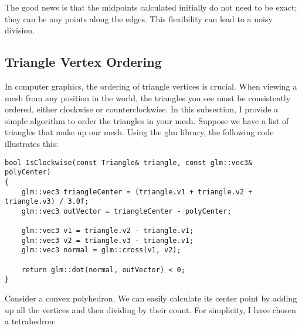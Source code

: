 \documentclass[12pt]{article}
\begin{document}
\begin{center}
	\end{center}
	
	The good news is that the midpoints calculated initially do not need to be exact; they can be any points along the edges. This flexibility can lead to a noisy division.
	
	\subsection{Triangle Vertex Ordering}
	
	In computer graphics, the ordering of triangle vertices is crucial. When viewing a mesh from any position in the world, the triangles you see must be consistently ordered, either clockwise or counterclockwise. In this subsection, I provide a simple algorithm to order the triangles in your mesh. Suppose we have a list of triangles that make up our mesh. Using the glm library, the following code illustrates this:
	
	\begin{lstlisting}[style=customcpp]
bool IsClockwise(const Triangle& triangle, const glm::vec3& polyCenter)
{
	glm::vec3 triangleCenter = (triangle.v1 + triangle.v2 + triangle.v3) / 3.0f;
	glm::vec3 outVector = triangleCenter - polyCenter;
	
	glm::vec3 v1 = triangle.v2 - triangle.v1;
	glm::vec3 v2 = triangle.v3 - triangle.v1;
	glm::vec3 normal = glm::cross(v1, v2);
	
	return glm::dot(normal, outVector) < 0;
}
	\end{lstlisting}
	
	Consider a convex polyhedron. We can easily calculate its center point by adding up all the vertices and then dividing by their count. For simplicity, I have chosen a tetrahedron:
	
\end{document}
